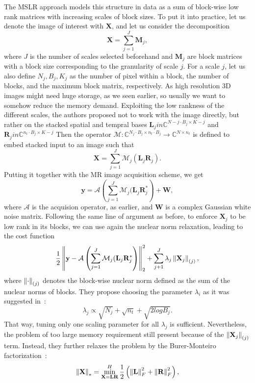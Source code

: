 The MSLR approach models this structure in data as a sum of block-wise low rank matrices with increasing scales of block sizes. To put it into practice, let us denote the image of interest with $\mathbf{X}$, and let us consider the decomposition
\[\mathbf{X} = \sum_{j=1}^J \mathbf{M}_j,\]
where $J$ is the number of scales selected beforehand and $\mathbf{M}_j$ are block matrices with a block size corresponding to the granularity of scale $j$. For a scale $j$, let us also define $N_j, B_j, K_j$ as the number of pixel within a block, the number of blocks, and the maximum block matrix, respectively. As high resolution 3D images might need huge storage, as we seen earlier, so usually we want to somehow reduce the memory demand. Exploiting the low rankness of the different scales, the authors proposed not to work with the image directly, but rather on the stacked spatial and tempral bases $\mathbf{L}_j in \mathbb{C}^{N-j\cdot B_j\times K-j}$ and $\mathbf{R}_j in \mathbb{C}^{n_t\cdot B_j\times K-j}$ Then the operator $\mathcal{M}:\mathbb{C}^{N_j \cdot B_j \times n_t \cdot B_j} \rightarrow \mathbb{C}^{N \times n_t}$ is defined to embed stacked input to an image such that
\[\mathbf{X} = \sum_{j=1}^J \mathcal{M}_j(\mathbf{L}_j\mathbf{R}_j).\]
Putting it together with the MR image acquisition scheme, we get
\[\mathbf{y} = \mathcal{A}\left(\sum_{j=1}^J \mathcal{M}_j(\mathbf{L}_j\mathbf{R}_j^*\right) + \mathbf{W},\]
where $\mathcal{A}$ is the acquision operator, as earlier, and $\mathbf{W}$ is a complex Gaussian white noise matrix. Following the same line of argument as before, to enforce $\mathbf{X}_j$ to be low rank in its blocks, we can use again the nuclear norm relaxation, leading to the cost function
\[\frac{1}{2}\left\lVert\mathbf{y} - \mathcal{A}\left(\sum_{j=1}^J \mathcal{M}_j(\mathbf{L}_j\mathbf{R}_j^*\right)\right\rVert_2^2 + \sum_{j+1}^J \lambda_j \left\lVert\mathbf{X}_j\right\rVert_{(j)},\]
where $\left\lVert\cdot\right\rVert_{(j)}$ denotes the block-wise nuclear norm defined as the sum of the nuclear norms of blocks. They propose choosing the parameter $\lambda_i$ as it was suggested in~\cite{ong_beyond_2016}:
\[\lambda_j \propto \sqrt{N_j} + \sqrt{n_t} + \sqrt{2 log B_j}.\]
That way, tuning only one scaling parameter for all $\lambda_j$ is sufficient. Nevertheless, the problem of too large memory requirement still present because of the $\left\lVert\mathbf{X}_j\right\rVert_{(j)}$ term. Instead, they further relaxes the problem by the Burer-Monteiro factorization~\cite{burer_nonlinear_2003, recht_guaranteed_2010}:
\[\left\lVert\mathbf{X}\right\rVert_* = \min_\mathbf{X = LR}^H \frac{1}{2}\left(\left\lVert\mathbf{L}\right\rVert_F^2 + \left\lVert\mathbf{R}\right\rVert_F^2\right),\]
